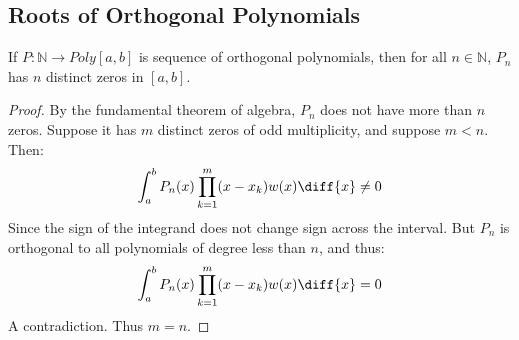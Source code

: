         \subsection{Roots of Orthogonal Polynomials}
            \begin{theorem}
                If $P:\mathbb{N}\rightarrow{Poly}[a,b]$ is
                sequence of orthogonal polynomials, then for
                all $n\in\mathbb{N}$, $P_{n}$ has $n$ distinct
                zeros in $[a,b]$.
            \end{theorem}
            \begin{proof}
                By the fundamental theorem of algebra, $P_{n}$
                does not have more than $n$ zeros. Suppose it
                has $m$ distinct zeros of odd multiplicity,
                and suppose $m<n$. Then:
                \begin{equation}
                    \int_{a}^{b}P_{n}(x)\prod_{k=1}^{m}
                        (x-x_{k})w(x)\diff{x}\ne{0}
                \end{equation}
                Since the sign of the integrand does not
                change sign across the interval. But $P_{n}$
                is orthogonal to all polynomials of degree less
                than $n$, and thus:
                \begin{equation}
                    \int_{a}^{b}P_{n}(x)\prod_{k=1}^{m}
                        (x-x_{k})w(x)\diff{x}=0
                \end{equation}
                A contradiction. Thus $m=n$.
            \end{proof}